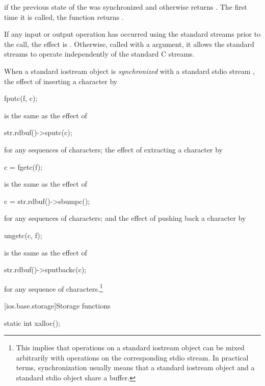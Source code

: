 \begin{itemdescr}
\pnum
\returns
{}
if the previous state of the 
was synchronized and otherwise returns
.
The first time it is called,
the function returns
.

\pnum
\effects
If any input or output operation has occurred using the standard streams prior to the
call, the effect is
.
Otherwise, called with a  argument, it allows the standard streams to
operate independently of the standard C streams.

\pnum
When a standard iostream object  is
\textit{synchronized}
with a standard stdio stream , the effect of inserting a character  by
\begin{codeblock}
fputc(f, c);
\end{codeblock}
is the same as the effect of
\begin{codeblock}
str.rdbuf()->sputc(c);
\end{codeblock}
for any sequences of characters; the effect of extracting a character  by
\begin{codeblock}
c = fgetc(f);
\end{codeblock}
is the same as the effect of
\begin{codeblock}
c = str.rdbuf()->sbumpc();
\end{codeblock}
for any sequences of characters; and the effect of pushing back a character  by
\begin{codeblock}
ungetc(c, f);
\end{codeblock}
is the same as the effect of
\begin{codeblock}
str.rdbuf()->sputbackc(c);
\end{codeblock}
for any sequence of characters.\footnote{This implies that operations on a standard iostream object can be mixed arbitrarily
with operations on the corresponding stdio stream. In practical terms, synchronization
usually means that a standard iostream object and a standard stdio object share a
buffer.
}
\end{itemdescr}

[ios.base.storage]{Storage functions}

%
\begin{itemdecl}
static int xalloc();
\end{itemdecl}

